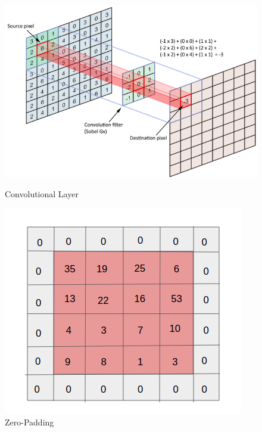 \begin{figure}[H]
	\begin{minipage}[b]{.55\linewidth} %
		\includegraphics[width=\linewidth]{Bilder/convolutional_layer.png}
		\caption[Convolutional Layer]{Convolutional Layer \cite{DaphneCornelisse.20180424}}
		\label{convolutional_layer}
	\end{minipage}
	\hspace{.05\linewidth}%
	\begin{minipage}[b]{.4\linewidth} %
		\includegraphics[width=\linewidth]{Bilder/zero_padding.png}
		\caption[Zero-Padding]{Zero-Padding \cite{AbhineetSaxena.20160629}}
		\label{zero_padding}
	\end{minipage}
\end{figure}

